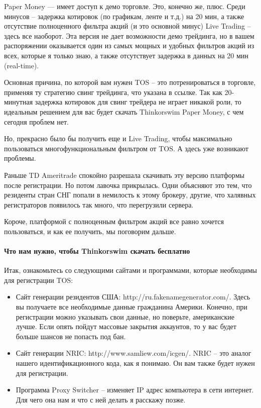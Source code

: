 \documentclass[a5paper]{article}
\begin{document}
    Paper Money — имеет доступ к демо торговле. Это, конечно же, плюс. Среди минусов – задержка котировок (по графикам, ленте и т.д.) на 20 мин, а также отсутствие полноценного фильтра акций (и это основной минус)
    Live Trading – здесь все наоборот. Эта версия не дает возможности демо трейдинга, но в вашем распоряжении оказывается один из самых мощных и удобных фильтров акций из всех, которые я только знаю, а также отсутствует задержка в данных на 20 мин (real-time).

Основная причина, по которой вам нужен TOS – это потренироваться в торговле, применяя ту стратегию свинг трейдинга, что указана в ссылке. Так как 20-минутная задержка котировок для свинг трейдера не играет никакой роли, то идеальным решением для вас будет скачать Thinkorswim Paper Money, с чем сегодня проблем нет.

Но, прекрасно было бы получить еще и Live Trading, чтобы максимально пользоваться многофункциональным фильтром от TOS. А здесь уже возникают проблемы.

Раньше TD Ameritrade спокойно разрешала скачивать эту версию платформы после регистрации. Но потом лавочка прикрылась. Одни объясняют это тем, что резиденты стран СНГ попали в немилость к этому брокеру, другие, что халявных регистраторов появилось так много, что перегрузили сервера.

Короче, платформой с полноценным фильтром акций все равно хочется
пользоваться, и как ее получить, мы поговорим дальше.

\paragraph{Что нам нужно, чтобы Thinkorswim скачать бесплатно}

Итак, ознакомьтесь со следующими сайтами и программами, которые необходимы для регистрации TOS:
\begin{itemize}
\item     Сайт генерации резидентов США: http://ru.fakenamegenerator.com/. Здесь вы получаете все необходимые данные гражданина Америки. Конечно, при регистрации можно указывать свои данные, но поверьте, американские лучше. Если опять пойдут массовые закрытия аккаунтов, то у вас будет больше шансов не попасть под бан.
\item     Сайт генерации NRIC: http://www.samliew.com/icgen/. NRIC – это аналог нашего идентификационного кода, как я понимаю. Он вам также будет нужен для регистрации.
\item     Программа Proxy Switcher – изменяет IP адрес компьютера в сети
    интернет. Для чего она нам и что с ней делать я расскажу позже.
  \end{itemize}
\end{document}
